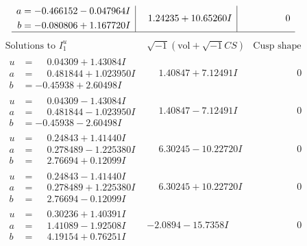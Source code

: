 \documentclass[1p]{elsarticle_modified}
\theoremstyle{definition}
\newcommand{\I}{\sqrt{-1}}
\begin{document}
$$\begin{array}{c|c|c}
\begin{aligned}
a &= -0.466152 - 0.047964 I \\
b &= -0.080806 + 1.167720 I\end{aligned}
 & \phantom{-}1.24235 + 10.65260 I & \phantom{-0.000000 } 0\\
 \hline 
 \end{array}$$\newpage$$\begin{array}{c|c|c}  
\text{Solutions to }I^u_{1}& \I (\text{vol} + \sqrt{-1}CS) & \text{Cusp shape}\\
 \hline 
\begin{aligned}
u &= \phantom{-}0.04309 + 1.43084 I \\
a &= \phantom{-}0.481844 + 1.023950 I \\
b &= -0.45938 + 2.60498 I\end{aligned}
 & \phantom{-}1.40847 + 7.12491 I & \phantom{-0.000000 } 0 \\ \hline\begin{aligned}
u &= \phantom{-}0.04309 - 1.43084 I \\
a &= \phantom{-}0.481844 - 1.023950 I \\
b &= -0.45938 - 2.60498 I\end{aligned}
 & \phantom{-}1.40847 - 7.12491 I & \phantom{-0.000000 } 0 \\ \hline\begin{aligned}
u &= \phantom{-}0.24843 + 1.41440 I \\
a &= \phantom{-}0.278489 - 1.225380 I \\
b &= \phantom{-}2.76694 + 0.12099 I\end{aligned}
 & \phantom{-}6.30245 - 10.22720 I & \phantom{-0.000000 } 0 \\ \hline\begin{aligned}
u &= \phantom{-}0.24843 - 1.41440 I \\
a &= \phantom{-}0.278489 + 1.225380 I \\
b &= \phantom{-}2.76694 - 0.12099 I\end{aligned}
 & \phantom{-}6.30245 + 10.22720 I & \phantom{-0.000000 } 0 \\ \hline\begin{aligned}
u &= \phantom{-}0.30236 + 1.40391 I \\
a &= \phantom{-}1.41089 - 1.92508 I \\
b &= \phantom{-}4.19154 + 0.76251 I\end{aligned}
 & -2.0894 - 15.7358 I & \phantom{-0.000000 } 0 \\ \hline\begin{aligned}

\end{aligned}
\end{array}$$
\end{document}

